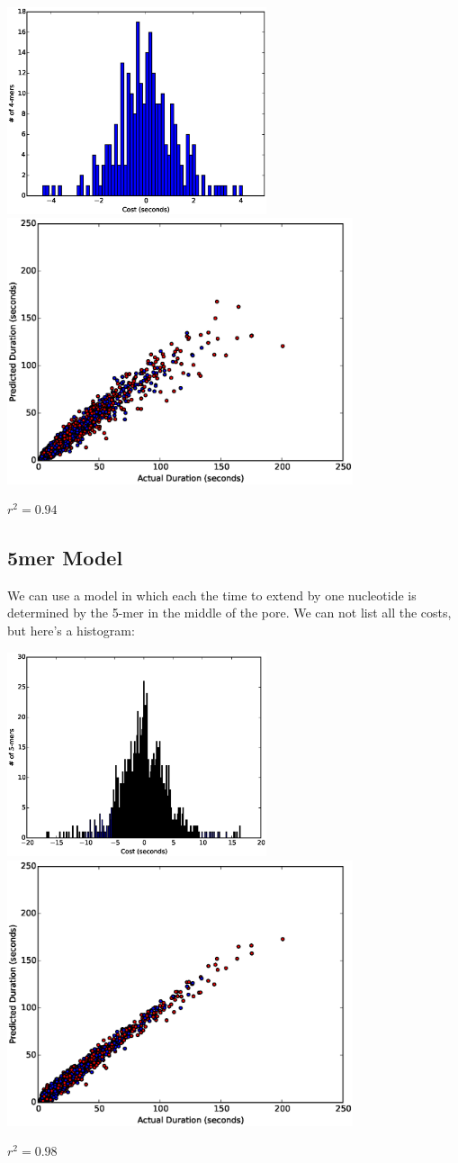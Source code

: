 \documentclass[11pt]{article}
\begin{document}
\includegraphics[width=3in]{part11hist4}\\
\includegraphics[width=4in]{part11scatter4mer}

$r^2=0.94$

\subsection*{5mer Model}

        We can use a model in which each the time to extend by one nucleotide is determined by the 5-mer in the middle of the
        pore.  We can not list all the costs, but here's a histogram:
        
\includegraphics[width=3in]{part11hist5}\\
\includegraphics[width=4in]{part11scatter5mer}

$r^2=0.98$
\end{document}
